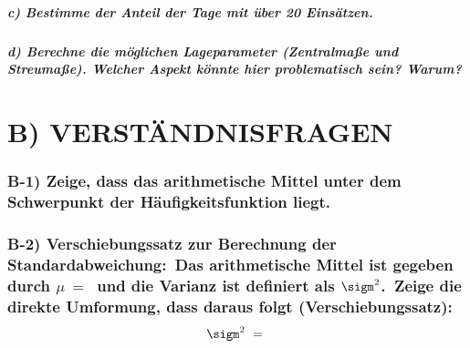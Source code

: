\documentclass[
]{article}
\begin{document}
\hypertarget{c-bestimme-der-anteil-der-tage-mit-uxfcber-20-einsuxe4tzen.}{%
\subparagraph{\texorpdfstring{\textbf{c) Bestimme der Anteil der Tage
mit über 20
Einsätzen.}}{c) Bestimme der Anteil der Tage mit über 20 Einsätzen.}}\label{c-bestimme-der-anteil-der-tage-mit-uxfcber-20-einsuxe4tzen.}}

\hypertarget{d-berechne-die-muxf6glichen-lageparameter-zentralmauxdfe-und-streumauxdfe.-welcher-aspekt-kuxf6nnte-hier-problematisch-sein-warum}{%
\subparagraph{\texorpdfstring{\textbf{d) Berechne die möglichen
Lageparameter (Zentralmaße und Streumaße). Welcher Aspekt könnte hier
problematisch sein?
Warum?}}{d) Berechne die möglichen Lageparameter (Zentralmaße und Streumaße). Welcher Aspekt könnte hier problematisch sein? Warum?}}\label{d-berechne-die-muxf6glichen-lageparameter-zentralmauxdfe-und-streumauxdfe.-welcher-aspekt-kuxf6nnte-hier-problematisch-sein-warum}}

\hypertarget{b-verstuxe4ndnisfragen}{%
\section{B) VERSTÄNDNISFRAGEN}\label{b-verstuxe4ndnisfragen}}

\hypertarget{b-1-zeige-dass-das-arithmetische-mittel-unter-dem-schwerpunkt-der-huxe4ufigkeitsfunktion-liegt.}{%
\subsubsection{B-1) Zeige, dass das arithmetische Mittel unter dem
Schwerpunkt der Häufigkeitsfunktion
liegt.}\label{b-1-zeige-dass-das-arithmetische-mittel-unter-dem-schwerpunkt-der-huxe4ufigkeitsfunktion-liegt.}}

\hypertarget{b-2-verschiebungssatz-zur-berechnung-der-standardabweichung-das-arithmetische-mittel-ist-gegeben-durch-mu-und-die-varianz-ist-definiert-als-sigm2.-zeige-die-direkte-umformung-dass-daraus-folgt-verschiebungssatz-sigm2}{%
\subsubsection{\texorpdfstring{B-2) Verschiebungssatz zur Berechnung der
Standardabweichung:~Das arithmetische Mittel ist gegeben durch
\(\mu\ =\ \) und die Varianz ist definiert als \(\sigm^2\).~Zeige die
direkte Umformung, dass daraus folgt
(Verschiebungssatz):~\[\sigm^2\ =\ \]}{B-2) Verschiebungssatz zur Berechnung der Standardabweichung:~Das arithmetische Mittel ist gegeben durch \textbackslash mu\textbackslash{} =\textbackslash{}  und die Varianz ist definiert als \textbackslash sigm\^{}2.~Zeige die direkte Umformung, dass daraus folgt (Verschiebungssatz):~\textbackslash sigm\^{}2\textbackslash{} =\textbackslash{} }}\label{b-2-verschiebungssatz-zur-berechnung-der-standardabweichung-das-arithmetische-mittel-ist-gegeben-durch-mu-und-die-varianz-ist-definiert-als-sigm2.-zeige-die-direkte-umformung-dass-daraus-folgt-verschiebungssatz-sigm2}}
\end{document}
